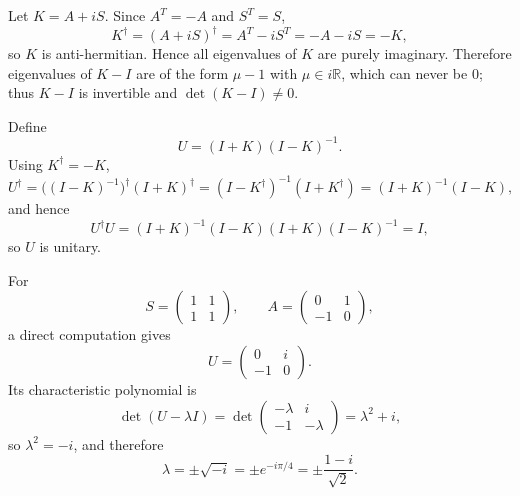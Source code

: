 \begin{solution}
Let $K=A+iS$. Since $A^T=-A$ and $S^T=S$,
\[
K^\dagger=(A+iS)^\dagger=A^T-iS^T=-A-iS=-K,
\]
so $K$ is anti-hermitian. Hence all eigenvalues of $K$ are purely imaginary. Therefore eigenvalues of $K-I$ are of the form
$\mu-1$ with $\mu\in i\mathbb R$, which can never be $0$; thus $K-I$ is invertible and $\det(K-I)\neq 0$.

Define
\[
U=(I+K)(I-K)^{-1}.
\]
Using $K^\dagger=-K$,
\[
U^\dagger=\bigl((I-K)^{-1}\bigr)^\dagger (I+K)^\dagger
=(I-K^\dagger)^{-1}(I+K^\dagger)
=(I+K)^{-1}(I-K),
\]
and hence
\[
U^\dagger U=(I+K)^{-1}(I-K)(I+K)(I-K)^{-1}=I,
\]
so $U$ is unitary.

For
\[
S=\begin{pmatrix}1&1\\1&1\end{pmatrix},\qquad
A=\begin{pmatrix}0&1\\-1&0\end{pmatrix},
\]
a direct computation gives
\[
U=\begin{pmatrix}0&i\\-1&0\end{pmatrix}.
\]
Its characteristic polynomial is
\[
\det(U-\lambda I)=\det\begin{pmatrix}-\lambda&i\\-1&-\lambda\end{pmatrix}
=\lambda^2+i,
\]
so $\lambda^2=-i$, and therefore
\[
\lambda=\pm \sqrt{-i}=\pm e^{-i\pi/4}=\pm\frac{1-i}{\sqrt2}.
\]
\end{solution}

